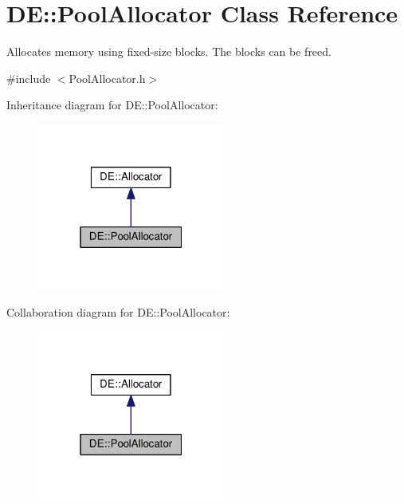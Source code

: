 \hypertarget{classDE_1_1PoolAllocator}{}\section{DE\+:\+:Pool\+Allocator Class Reference}
\label{classDE_1_1PoolAllocator}


Allocates memory using fixed-\/size blocks. The blocks can be freed.  




{\ttfamily \#include $<$Pool\+Allocator.\+h$>$}



Inheritance diagram for DE\+:\+:Pool\+Allocator\+:
\nopagebreak
\begin{figure}[H]
\begin{center}
\leavevmode
\includegraphics[width=175pt]{classDE_1_1PoolAllocator__inherit__graph}
\end{center}
\end{figure}


Collaboration diagram for DE\+:\+:Pool\+Allocator\+:
\nopagebreak
\begin{figure}[H]
\begin{center}
\leavevmode
\includegraphics[width=175pt]{classDE_1_1PoolAllocator__coll__graph}
\end{center}
\end{figure}
